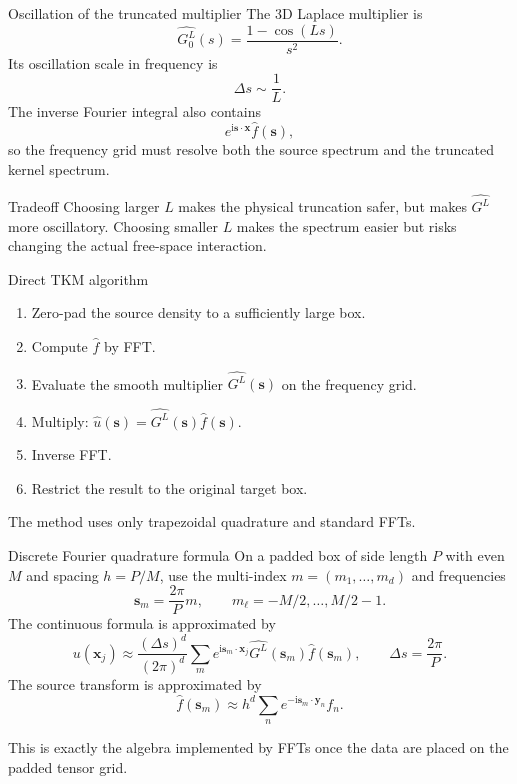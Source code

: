 \documentclass[aspectratio=169,11pt]{beamer}
\newcommand{\ii}{\mathrm i}
\newcommand{\x}{\bm{x}}
\newcommand{\y}{\bm{y}}
\newcommand{\s}{\bm{s}}
\begin{document}
\begin{frame}{Oscillation of the truncated multiplier}
\small
The 3D Laplace multiplier is
\[
  \widehat{G_0^L}(s)=\frac{1-\cos(Ls)}{s^2}.
\]
Its oscillation scale in frequency is
\[
  \Delta s\sim \frac{1}{L}.
\]
The inverse Fourier integral also contains
\[
  e^{\ii\s\cdot\x}\widehat f(\s),
\]
so the frequency grid must resolve both the source spectrum and the truncated
kernel spectrum.

\begin{block}{Tradeoff}
Choosing larger $L$ makes the physical truncation safer, but makes
$\widehat{G^L}$ more
oscillatory.  Choosing smaller $L$ makes the spectrum easier but risks changing
the actual free-space interaction.
\end{block}
\end{frame}

\begin{frame}{Direct TKM algorithm}
\small
\begin{enumerate}
  \item Zero-pad the source density to a sufficiently large box.
  \item Compute $\widehat f$ by FFT.
  \item Evaluate the smooth multiplier $\widehat{G^L}(\s)$ on the frequency grid.
  \item Multiply: $\widehat u(\s)=\widehat{G^L}(\s)\widehat f(\s)$.
  \item Inverse FFT.
  \item Restrict the result to the original target box.
\end{enumerate}

\vspace{2mm}
The method uses only trapezoidal quadrature and standard FFTs.
\end{frame}

\begin{frame}{Discrete Fourier quadrature formula}
\small
On a padded box of side length $P$ with even $M$ and spacing $h=P/M$, use
the multi-index $m=(m_1,\ldots,m_d)$ and frequencies
\[
  \s_m=\frac{2\pi}{P}m,\qquad
  m_\ell=-M/2,\ldots,M/2-1.
\]
The continuous formula is approximated by
\[
  u(\x_j)
  \approx
  \frac{(\Delta s)^d}{(2\pi)^d}
  \sum_m e^{\ii\s_m\cdot\x_j}
  \widehat{G^L}(\s_m)\widehat f(\s_m),
  \qquad
  \Delta s=\frac{2\pi}{P}.
\]
The source transform is approximated by
\[
  \widehat f(\s_m)\approx h^d\sum_n e^{-\ii\s_m\cdot\y_n}f_n.
\]

\vspace{1mm}
This is exactly the algebra implemented by FFTs once the data are placed on the
padded tensor grid.
\end{frame}
\end{document}
